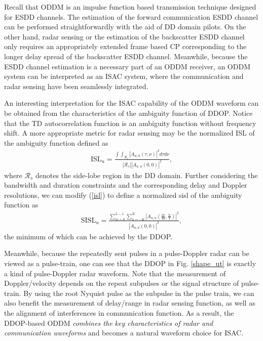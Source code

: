 \documentclass[journal]{IEEEtran}
\begin{document}
{Recall that ODDM is an impulse function based transmission technique designed for ESDD channels. The estimation of the forward communication ESDD channel can be performed straightforwardly with the aid of DD domain pilots. On the other hand, radar sensing or the estimation of the backscatter ESDD channel only requires an appropriately extended frame based CP corresponding to the longer delay spread of the backscatter ESDD channel.
Meanwhile, because the ESDD channel estimation is a necessary part of an ODDM receiver, an ODDM system can be interpreted as an ISAC system, where the communication and radar sensing have been seamlessly integrated.

An interesting interpretation for the ISAC capability of the ODDM waveform can be obtained from the characteristics of the {ambiguity function of DDOP}.
Notice that the TD autocorrelation function is an ambiguity function without frequency shift. A more appropriate metric for radar sensing may be the normalized ISL of the ambiguity function defined as\cite{keskin_tsp_2021}
\begin{align}\label{isl}
  \textrm{ISL}_u=\frac{\int\int_{\mathcal R_s} |A_{u,u}(\tau, \nu)|^2d\tau d\nu}{|\mathcal R_s||A_{u,u}(0, 0)|^2},
\end{align}
where $\mathcal R_s$ denotes the side-lobe region in the DD domain.
Further considering the bandwidth and duration constraints and the corresponding  delay and Doppler resolutions, we can modify (\ref{isl}) to define a normalized \ac{sisl} of the ambiguity function as
\begin{align}\label{snisl}
  \textrm{SISL}_u=\frac{\sum_{m=0}^{L-1}\sum_{n=-K}^{K}|A_{u,u}(\frac{m}{\mathsf W},\frac{n}{\mathsf T})|^2}{|A_{u,u}(0, 0)|^2},
\end{align}
{the minimum of which} can be achieved by the DDOP.

Meanwhile, because the repeatedly sent pulses in a pulse-Doppler radar can be viewed as a pulse-train\cite{radar_handbook}, one can see  that the DDOP in Fig. \ref{shape_ut} is exactly a kind of pulse-Doppler radar waveform. Note that the measurement of Doppler/velocity depends on the repeat subpulses or the signal structure of pulse-train. By using the root Nyquist pulse as  the subpulse in the pulse train, we can also benefit the measurement of delay/range in radar sensing function, as well as the alignment of interferences in communication function. As a result, the DDOP-based ODDM \emph{combines the key characteristics of radar and communication waveforms} and becomes a natural waveform choice for ISAC.


}
\end{document}
